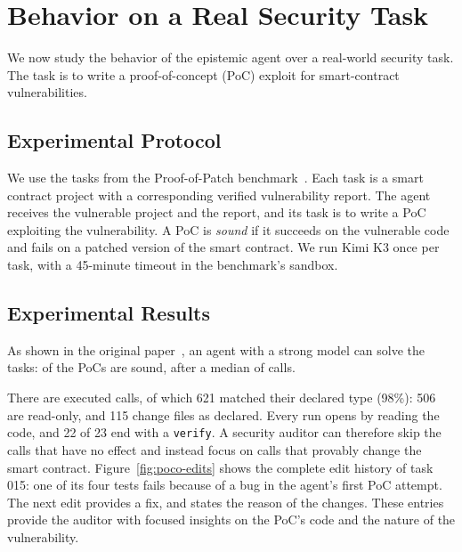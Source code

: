 \documentclass{article}
\theoremstyle{plain}
\theoremstyle{definition}
\theoremstyle{remark}
\begin{document}


\section{Behavior on a Real Security Task}

We now study the behavior of the epistemic agent over a real-world security task. The task is to write a proof-of-concept (PoC) exploit for smart-contract vulnerabilities.


\subsection{Experimental Protocol}
We use the tasks from the Proof-of-Patch benchmark~\cite{Andersson2026PoCo}.
Each task is a smart contract project with a corresponding verified vulnerability report.
The agent receives the vulnerable project and the report, and its task is to write a PoC exploiting the vulnerability.
A PoC is \emph{sound} if it succeeds on the vulnerable code and fails on a patched version of the smart contract.
We run Kimi K3 once per task, with a 45-minute timeout in the benchmark's sandbox.


\subsection{Experimental Results}
As shown in the original paper~\cite{Andersson2026PoCo}, an agent with a strong model can solve the tasks:
\EfourNsound{} of the \EfourNfindings{} PoCs are sound, after a median of \EfourMedianCalls{} calls. 

There are \EfourNcalls{} executed calls, of which 621 matched their declared type (98\%): 506 are read-only, and 115 change files as declared.
Every run opens by reading the code, and 22 of 23 end with a \texttt{verify}. 
A security auditor can therefore skip the calls that have no effect and instead focus on calls that provably change the smart contract.
Figure~\ref{fig:poco-edits} shows the complete edit history of task 015: one of its four tests fails because of a bug in the agent's first PoC attempt. The next edit provides a fix, and states the reason of the changes. These entries provide the auditor with focused insights on the PoC's code and the nature of the vulnerability.
\end{document}
